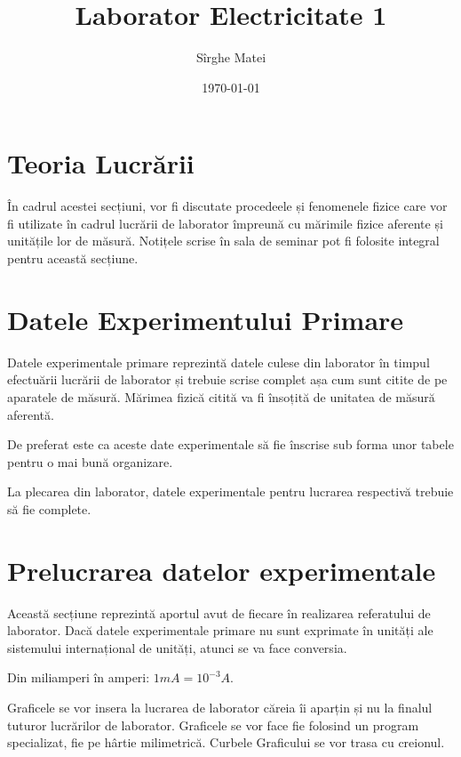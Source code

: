 \documentclass[12pt]{article}
\title{\bfseries Laborator Electricitate 1}
\author{Sîrghe Matei}
\date{\today}
\begin{document}
\maketitle

\section{Teoria Lucrării}
În cadrul acestei secțiuni, vor fi discutate procedeele și fenomenele fizice care vor fi utilizate în cadrul lucrării de laborator împreună
cu mărimile fizice aferente și unitățile lor de măsură. Notițele scrise în sala de seminar pot fi folosite integral pentru această secțiune.

\section{Datele Experimentului Primare}
Datele experimentale primare reprezintă datele culese din laborator în timpul efectuării lucrării de laborator și trebuie scrise complet așa
cum sunt citite de pe aparatele de măsură. Mărimea fizică citită va fi însoțită de unitatea de măsură aferentă.

\begin{tcolorbox}[colback=yellow!10!white, colframe=black, title=Observație]
De preferat este ca aceste date experimentale să fie înscrise sub forma unor tabele pentru o mai bună organizare.
\end{tcolorbox}

\begin{tcolorbox}[colback=yellow!10!white, colframe=black, title=Observație]
La plecarea din laborator, datele experimentale pentru lucrarea respectivă trebuie să fie complete.
\end{tcolorbox}

\section{Prelucrarea datelor experimentale}
Această secțiune reprezintă aportul avut de fiecare în realizarea referatului de laborator. Dacă datele experimentale primare nu sunt exprimate
în unități ale sistemului internațional de unități, atunci se va face conversia.

\begin{tcolorbox}[colback=yellow!10!white, colframe=black, title=Exemplu]
Din miliamperi în amperi: $1 mA = 10^{-3} A$.
\end{tcolorbox}

Graficele se vor insera la lucrarea de laborator căreia îi aparțin și nu la finalul tuturor lucrărilor de laborator. Graficele se vor face fie folosind
un program specializat, fie pe hârtie milimetrică. Curbele Graficului se vor trasa cu creionul.
\end{document}
